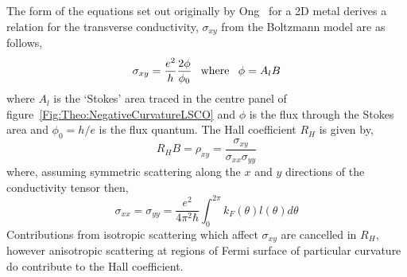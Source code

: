 The form of the equations set out originally by Ong~\cite{Ong1991} for a 2D metal derives a relation for the transverse conductivity, $\sigma_{xy}$ from the Boltzmann model are as follows,
\begin{equation}
    \sigma_{xy} = \frac{e^2}{h}\frac{2\phi}{\phi_0} \hspace{8px}\textrm{where}\hspace{8px}\phi = A_l B
\end{equation}
where $A_l$ is the `Stokes' area traced in the centre panel of figure~\ref{Fig:Theo:NegativeCurvatureLSCO} and $\phi$ is the flux through the Stokes area and $\phi_0 = h/e$ is the flux quantum. The Hall coefficient $R_H$ is given by,
\begin{equation}
    R_HB = \rho_{xy} = \frac{\sigma_{xy}}{\sigma_{xx}\sigma_{yy}}
\end{equation}
where, assuming symmetric scattering along the $x$ and $y$ directions of the conductivity tensor then,
\begin{equation}
    \sigma_{xx} = \sigma_{yy} = \frac{e^2}{4\pi^2 \hbar} \int^{2\pi}_0 k_F(\theta) l(\theta) d\theta
\end{equation} 
Contributions from isotropic scattering which affect $\sigma_{xy}$ are cancelled in $R_H$, however anisotropic scattering at regions of Fermi surface of particular curvature do contribute to the Hall coefficient.
